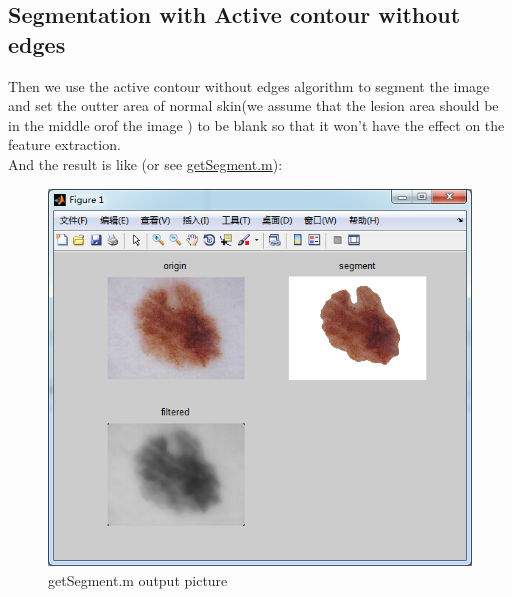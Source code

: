 \documentclass[14pt]{report} %
\begin{document}
\subsection{Segmentation with Active contour without edges}
	Then we use the active contour without edges algorithm to segment the image and set the outter area of normal skin(we assume that the lesion area should be in the middle orof the image ) to be blank so that it won't have the effect on the feature extraction.
	\\And the result is like (or see  \hyperref[section:getSegment.m]{getSegment.m}):
	\begin{figure}[H]
		\includegraphics[width=\textwidth]{image/segmentResult.jpg} 
		\caption{getSegment.m output picture} 
		 \label{fig:OutputofgetSegment_copy1} 
	\end{figure}
\end{document}
